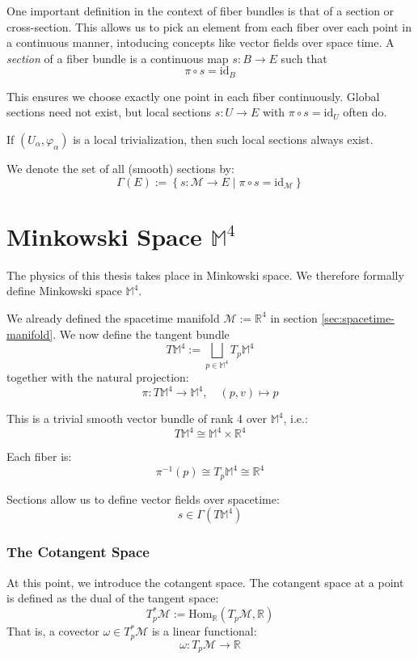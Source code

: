 One important definition in the context of fiber bundles is that of a section or cross-section. This allows us to pick an element from each fiber over each point in a continuous manner, intoducing concepts like vector fields over space time.
A \emph{section} of a fiber bundle is a continuous map $s: B \to E$ such that
\[
\pi \circ s = \mathrm{id}_B
\]

This ensures we choose exactly one point in each fiber continuously. Global sections need not exist, but local sections $s: U \to E$ with $\pi \circ s = \mathrm{id}_U$ often do.

If $(U_\alpha, \varphi_\alpha)$ is a local trivialization, then such local sections always exist.

We denote the set of all (smooth) sections by:
\[
\Gamma(E) := \left\{ s: \mathcal{M} \to E \mid \pi \circ s = \mathrm{id}_{\mathcal{M}} \right\}
\]
\section{Minkowski Space \texorpdfstring{$\mathbb{M}^4$}{M⁴}}

The physics of this thesis takes place in Minkowski space. We therefore formally define Minkowski space $\mathbb{M}^4$.

We already defined the spacetime manifold $\mathcal{M} := \mathbb{R}^4$ in section \ref{sec:spacetime-manifold}. We now define the tangent bundle
\[
T\mathbb{M}^4 := \bigsqcup_{p \in \mathbb{M}^4} T_p \mathbb{M}^4
\]
together with the natural projection:
\[
\pi: T\mathbb{M}^4 \to \mathbb{M}^4, \quad (p, v) \mapsto p
\]

This is a trivial smooth vector bundle of rank 4 over $\mathbb{M}^4$, i.e.:
\[
T\mathbb{M}^4 \cong \mathbb{M}^4 \times \mathbb{R}^4
\]

Each fiber is:
\[
\pi^{-1}(p) \cong T_p \mathbb{M}^4 \cong \mathbb{R}^4
\]

Sections allow us to define vector fields over spacetime:
\[
s \in \Gamma(T\mathbb{M}^4)
\]

\subsubsection*{The Cotangent Space}

At this point, we introduce the cotangent space.  
The cotangent space at a point is defined as the dual of the tangent space:
\[
T_p^*\mathcal{M} := \text{Hom}_\mathbb{R}(T_p \mathcal{M}, \mathbb{R})
\]
That is, a covector $\omega \in T_p^*\mathcal{M}$ is a linear functional:
\[
\omega: T_p \mathcal{M} \to \mathbb{R}
\]

